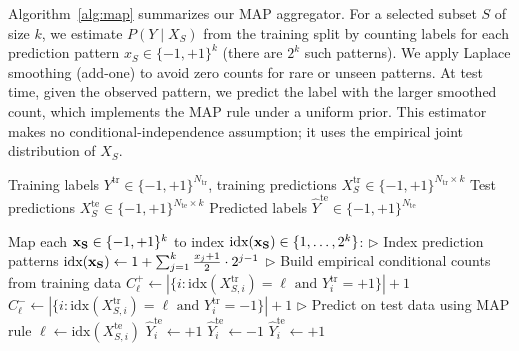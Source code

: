 \documentclass{article}
\theoremstyle{plain}
\theoremstyle{definition}
\theoremstyle{remark}
\begin{document}
Algorithm~\ref{alg:map} summarizes our MAP aggregator. For a selected subset $S$ of size $k$, we estimate $P(Y \mid X_S)$ from the training split by counting labels for each prediction pattern $x_S \in \{-1,+1\}^k$ (there are $2^k$ such patterns). We apply Laplace smoothing (add-one) to avoid zero counts for rare or unseen patterns. At test time, given the observed pattern, we predict the label with the larger smoothed count, which implements the MAP rule under a uniform prior. This estimator makes no conditional-independence assumption; it uses the empirical joint distribution of $X_S$.

\begin{algorithm}[ht]
\caption{The MAP Aggregation}
\label{alg:map}
\begin{algorithmic}[1]
\REQUIRE Training labels $Y^{\text{tr}} \in \{-1, +1\}^{N_{\text{tr}}}$, training predictions $X^{\text{tr}}_S \in \{-1, +1\}^{N_{\text{tr}} \times k}$
\REQUIRE Test predictions $X^{\text{te}}_S \in \{-1, +1\}^{N_{\text{te}} \times k}$
\ENSURE Predicted labels $\hat{Y}^{\text{te}} \in \{-1, +1\}^{N_{\text{te}}}$

\STATE Map each ${\bf x_S }\in \{-1, +1\}^k$ to index 
$\text{idx}({\bf x_S}) \in \{1, \ldots, 2^k\}$: \hfill $\triangleright$ Index prediction patterns
\STATE \hspace{1em} $\text{idx}({\bf x_S}) \leftarrow 1 + \sum_{j=1}^{k} \frac{x_j + 1}{2} \cdot 2^{j-1}$
\STATE
\STATE \hfill $\triangleright$ Build empirical conditional counts from training data
    \STATE $C^{+}_\ell \leftarrow |\{i : \text{idx}(X^{\text{tr}}_{S,i}) = \ell \text{ and } Y^{\text{tr}}_i = +1\}| + 1$ 
    \STATE $C^{-}_\ell \leftarrow |\{i : \text{idx}(X^{\text{tr}}_{S,i}) = \ell \text{ and } Y^{\text{tr}}_i = -1\}| + 1$
\ENDFOR
\STATE
\STATE \hfill $\triangleright$ Predict on test data using MAP rule
    \STATE $\ell \leftarrow \text{idx}(X^{\text{te}}_{S,i})$
        \STATE $\hat{Y}^{\text{te}}_i \leftarrow +1$
        \STATE $\hat{Y}^{\text{te}}_i \leftarrow -1$
    \ELSE
        \STATE $\hat{Y}^{\text{te}}_i \leftarrow +1$ 
    \ENDIF
\ENDFOR
\end{algorithmic}
\end{algorithm}
\end{document}
